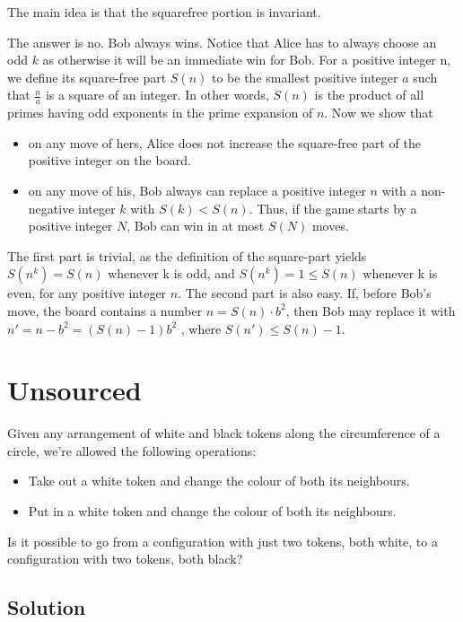 \documentclass[mast]{lucky}
\begin{document}
The main idea is that the squarefree portion is invariant.

The answer is no. Bob always wins. Notice that Alice has to always choose an odd $k$ as otherwise it will be an immediate win for Bob. For a positive integer n, we define its square-free part
$S(n)$ to be the smallest positive integer $a$ such that $\frac{n}{a}$ is a square of an integer. In other words,
$S(n)$ is the product of all primes having odd exponents in the prime expansion of $n$.
Now we show that \begin{itemize}
    \item on any move of hers, Alice does not increase the square-free part of the positive integer on the board.
    \item on any move of his, Bob always can replace a positive integer $n$ with a non-negative integer $k$ with $S(k) < S(n)$. Thus, if the game starts by a positive integer $N$, Bob can win in at most $S(N)$ moves.
\end{itemize}  
The first part is trivial, as the definition of the square-part yields $S(n^k) = S(n)$ whenever k is odd, and $S(n^k) = 1 \leq S(n)$ whenever k is even, for any positive integer $n$.
The second part is also easy. If, before Bob’s move, the board contains a number $n = S(n)\cdot b^2$, then Bob may replace it with $n' = n - b^2 = (S(n) - 1)b^2$ , where $S(n') \leq S(n) - 1.$ 
 
\pagebreak\section{Unsourced}

Given any arrangement of white and black tokens along the circumference of a circle, we're allowed the following operations:
    \begin{itemize}
        \item Take out a white token and change the colour of both its neighbours.
        
        \item Put in a white token and change the colour of both its neighbours.
    \end{itemize}
    Is it possible to go from a configuration with just two tokens, both white, to a configuration with two tokens, both black?

\subsection{Solution}
\end{document}
